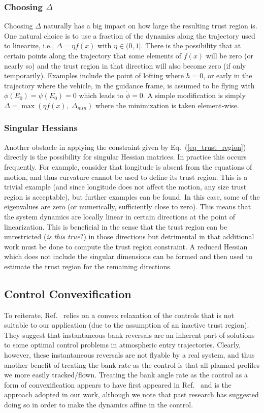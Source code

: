 \documentclass[10pt,a4paper]{article}
\begin{document}
	\subsubsection{Choosing $ \Delta $}
	Choosing $\Delta$ naturally has a big impact on how large the resulting trust region is. One natural choice is to use a fraction of the dynamics along the trajectory used to linearize, i.e., $\Delta = \eta f(x)$ with $\eta\in(0,1]$. There is the possibility that at certain points along the trajectory that some elements of $f(x)$ will be zero (or nearly so) and the trust region in that direction will also become zero (if only temporarily). Examples include the point of lofting where $\dot{h}=0$, or early in the trajectory where the vehicle, in the guidance frame, is assumed to be flying with $\phi(E_0)=\psi(E_0)=0$ which leads to $\dot{\phi}=0$. A simple modification is simply $\Delta = \max(\eta f(x),\; \Delta_{min})$ where the minimization is taken element-wise.
	\subsubsection{Singular Hessians }
	Another obstacle in applying the constraint given by Eq.~(\ref{eq_trust_region}) directly is the possibility for singular Hessian matrices. In practice this occurs frequently. For example, consider that longitude is absent from the equations of motion, and thus curvature cannot be used to define its trust region. This is a trivial example (and since longitude does not affect the motion, any size trust region is acceptable), but further examples can be found. In this case, some of the eigenvalues are zero (or numerically, sufficiently close to zero). This means that the system dynamics are locally linear in certain directions at the point of linearization. This is beneficial in the sense that the trust region can be unrestricted (\textit{is this true}?) in those directions but detrimental in that additional work must be done to compute the trust region constraint. A reduced Hessian which does not include the singular dimensions can be formed and then used to estimate the trust region for the remaining directions.
	
	\subsection{Control Convexification}
	To reiterate, Ref.~\cite{SOCP Lu} relies on a convex relaxation of the controls that is not suitable to our application (due to the assumption of an inactive trust region). They suggest that instantaneous bank reversals are an inherent part of solutions to some optimal control problems in atmospheric entry trajectories. Clearly, however, these instantaneous reversals are not flyable by a real system, and thus another benefit of treating the bank rate as the control is that all planned profiles we more easily tracked/flown. Treating the bank angle rate as the control as a form of convexification appears to have first appeared in Ref.~\cite{SOCP WangGrant} and is the approach adopted in our work, although we note that past research has suggested doing so in order to make the dynamics affine in the control.
	
\end{document}

